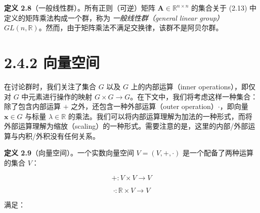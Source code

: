 \textbf{定义 2.8}（一般线性群）。所有正则（可逆）矩阵 $ \boldsymbol{A} \in \mathbb{R}^{n \times n} $ 的集合关于 (2.13) 中定义的矩阵乘法构成一个群，称为 \emph{一般线性群（general linear group）} $ GL(n, \mathbb{R}) $。然而，由于矩阵乘法不满足交换律，该群不是阿贝尔群。

\section*{2.4.2 向量空间}

在讨论群时，我们关注了集合 $ G $ 以及 $ G $ 上的内部运算（inner operations），即仅对 $ G $ 中元素进行操作的映射 $ G \times G \to G $。在下文中，我们将考虑这样一种集合：除了包含内部运算 $ + $ 之外，还包含一种外部运算（outer operation）$ \cdot $，即向量 $ \boldsymbol{x} \in G $ 与标量 $ \lambda \in \mathbb{R} $ 的乘法。我们可以将内部运算理解为加法的一种形式，而将外部运算理解为缩放（scaling）的一种形式。需要注意的是，这里的内部/外部运算与内积/外积没有任何关系。

\textbf{定义 2.9}（向量空间）。一个实数向量空间 $ V = (V, +, \cdot) $ 是一个配备了两种运算的集合 $ V $：

\begin{equation}
+ : V \times V \to V
\tag{2.62}\label{eq:2-62}
\end{equation}

\begin{equation}
\cdot : \mathbb{R} \times V \to V
\tag{2.63}\label{eq:2-63}
\end{equation}

满足：

